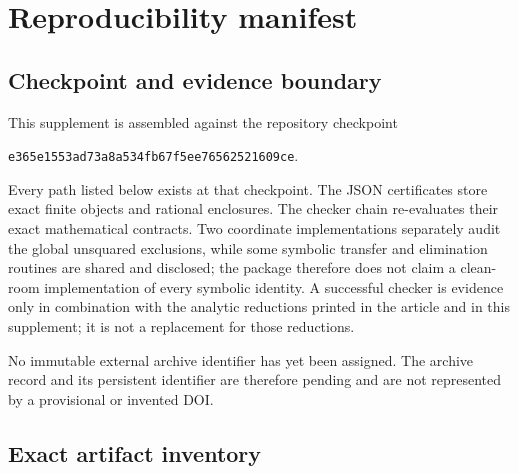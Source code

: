 \section{Reproducibility manifest}
\label{sec:reproducibility}

\subsection{Checkpoint and evidence boundary}

This supplement is assembled against the repository checkpoint
\begin{center}
\texttt{e365e1553ad73a8a534fb67f5ee76562521609ce}.
\end{center}
Every path listed below exists at that checkpoint.  The JSON certificates
store exact finite objects and rational enclosures.  The checker chain
re-evaluates their exact mathematical contracts.  Two coordinate
implementations separately audit the global unsquared exclusions, while
some symbolic transfer and elimination routines are shared and disclosed;
the package therefore does not claim a clean-room implementation of every
symbolic identity.  A successful checker is evidence only in
combination with the analytic reductions printed in the article and in this
supplement; it is not a replacement for those reductions.

No immutable external archive identifier has yet been assigned.  The
archive record and its persistent identifier are therefore pending and are
not represented by a provisional or invented DOI.

\subsection{Exact artifact inventory}

